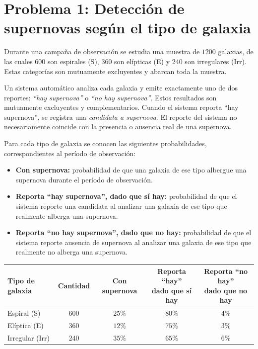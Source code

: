 \documentclass[a4paper]{article}
\begin{document}
\section{Problema 1: Detección de supernovas según el tipo de galaxia}

Durante una campaña de observación se estudia una muestra de $1200$ galaxias, de las cuales $600$ son espirales (S), $360$ son elípticas (E) y $240$ son irregulares (Irr). Estas categorías son mutuamente excluyentes y abarcan toda la muestra.

Un sistema automático analiza cada galaxia y emite exactamente uno de dos reportes: \textit{``hay supernova''} o \textit{``no hay supernova''}. Estos resultados son mutuamente excluyentes y complementarios. Cuando el sistema reporta ``hay supernova'', se registra una \textit{candidata a supernova}. El reporte del sistema no necesariamente coincide con la presencia o ausencia real de una supernova.

Para cada tipo de galaxia se conocen las siguientes probabilidades, correspondientes al período de observación:
\begin{itemize}
    \item \textbf{Con supernova:} probabilidad de que una galaxia de ese tipo albergue una supernova durante el período de observación.
    \item \textbf{Reporta ``hay supernova'', dado que sí hay:} probabilidad de que el sistema reporte una candidata al analizar una galaxia de ese tipo que realmente alberga una supernova.
    \item \textbf{Reporta ``no hay supernova'', dado que no hay:} probabilidad de que el sistema reporte ausencia de supernova al analizar una galaxia de ese tipo que realmente no alberga una supernova.
\end{itemize}

\begin{center}
\begin{tabular}{lcccc}
\toprule
Tipo de galaxia & Cantidad & Con supernova & \shortstack{Reporta ``hay''\\dado que sí hay} & \shortstack{Reporta ``no hay''\\dado que no hay} \\
\midrule
Espiral (S)     & $600$ & $25\%$ & $80\%$ & $4\%$ \\
Elíptica (E)    & $360$ & $12\%$ & $75\%$ & $3\%$ \\
Irregular (Irr) & $240$ & $35\%$ & $65\%$ & $6\%$ \\
\bottomrule
\end{tabular}
\end{center}
\end{document}
